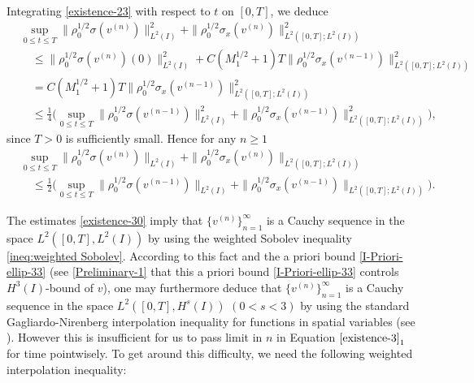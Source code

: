 \documentclass[11pt, reqno]{amsart}
\numberwithin{equation}{section}
\begin{document}
{Integrating \eqref{existence-23} with respect to \(t\) on \([0,T]\), we deduce 
	\begin{equation*}
		\begin{aligned}
			&\underset{0\leq t\leq T}{\sup}\|\rho_0^{1/2}\sigma(v^{(n)})\|_{L^2(I)}^2+\|\rho_0^{1/2}\sigma_x(v^{(n)})\|_{L^2([0,T];L^2(I))}^2\\
			&\quad\leq \|\rho_0^{1/2}\sigma(v^{(n)})(0)\|_{L^2(I)}^2+C(M_1^{1/2}+1)T\|\rho_0^{1/2}\sigma_x(v^{(n-1)})\|_{L^2([0,T];L^2(I))}^2\\
			&\quad=C(M_1^{1/2}+1)T\|\rho_0^{1/2}\sigma_x(v^{(n-1)})\|_{L^2([0,T];L^2(I))}^2\\
			&\quad\leq \frac{1}{4}\big(\underset{0\leq t\leq T}{\sup}\|\rho_0^{1/2}\sigma(v^{(n-1)})\|_{L^2(I)}^2+
			\|\rho_0^{1/2}\sigma_x(v^{(n-1)})\|_{L^2([0,T];L^2(I))}^2\big),
		\end{aligned}
	\end{equation*}
since \(T>0\) is sufficiently small.
Hence for any \(n\geq 1\)
\begin{equation}\label{existence-30}
	\begin{aligned}
		&\underset{0\leq t\leq T}{\sup}\|\rho_0^{1/2}\sigma(v^{(n)})\|_{L^2(I)}+\|\rho_0^{1/2}\sigma_x(v^{(n)})\|_{L^2([0,T];L^2(I))}\\
		&\quad\leq \frac{1}{2}\big(\underset{0\leq t\leq T}{\sup}\|\rho_0^{1/2}\sigma(v^{(n-1)})\|_{L^2(I)}+
		\|\rho_0^{1/2}\sigma_x(v^{(n-1)})\|_{L^2([0,T];L^2(I))}\big).
	\end{aligned}
\end{equation}	
	
	

The estimates \eqref{existence-30} imply that \(\{v^{(n)}\}_{n=1}^\infty\) is a Cauchy sequence in the space \(L^2([0,T],L^2(I))\) by using the weighted Sobolev inequality \eqref{ineq:weighted Sobolev}. According to this fact and the a priori bound \eqref{I-Priori-ellip-33} (see \eqref{Preliminary-1} that this a priori bound \eqref{I-Priori-ellip-33} controls \(H^3(I)\)-bound of \(v\)), one may furthermore deduce that \(\{v^{(n)}\}_{n=1}^\infty\) is a Cauchy sequence in the space \(L^2([0,T],H^s(I))\) \((0<s<3)\) by using the standard Gagliardo-Nirenberg interpolation inequality for functions in spatial variables (see \cite{MR3813967}). 
However this is insufficient for us to pass limit in \(n\) in Equation \(\eqref{existence-3}_1\) for time pointwisely. To get around this difficulty, we need the following weighted interpolation inequality:

}
\end{document}
